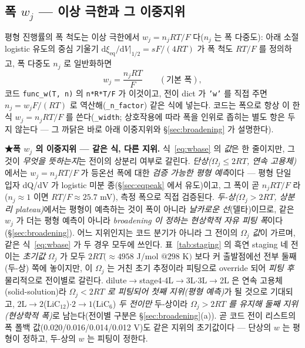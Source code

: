 \documentclass[11pt,a4paper]{article}
\newcommand{\dd}{\mathrm{d}}
\newcommand{\eq}{\mathrm{eq}}
\newcommand{\code}[1]{\texttt{#1}}
\begin{document}
\subsection{폭 $w_j$ — 이상 극한과 그 이중지위}
평형 진행률의 폭 척도는 이상 극한에서 $w_j=n_jRT/F$ 다($n_j$ 는 폭 다중도): 아래 소절 logistic 유도의
중심 기울기 $\dd\xi_\eq/\dd V|_{1/2}=sF/(4RT)$ 가 폭 척도 $RT/F$ 를 정의하고, 폭 다중도 $n_j$ 로 일반화하면
\begin{equation}
w_j=\frac{n_jRT}{F}\qquad(\text{기본 폭}),
\label{eq:wbase}
\end{equation}
코드 \code{func\_w(T, n)} 의 \code{n*R*T/F}
가 이것이고, 전이 dict 가 \code{'w'} 를 직접 주면 $n_j=w_jF/(RT)$ 로 역산해(\code{\_n\_factor}) 같은 식에 넣는다.
코드는 폭으로 항상 이 한 식 $w_j=n_jRT/F$ 를 쓴다(\code{\_width}; 상호작용에 따라 폭을 인위로 좁히는 별도 항은 두지
않는다 — 그 까닭은 바로 아래 이중지위와 \S\ref{sec:broadening} 가 설명한다).

\textbf{★폭 $w_j$ 의 이중지위 — 같은 식, 다른 지위.} 식~\eqref{eq:wbase} 의 \emph{값}은 한 줄이지만, 그것이
\emph{무엇을 뜻하는지}는 전이의 상분리 여부로 갈린다. \emph{단상($\Omega_j\le2RT$, 연속 고용체)}에서는 $w_j=n_jRT/F$
가 등온선 폭에 대한 \emph{검증 가능한 평형 예측}이다 — 평형 단일 입자 dQ/dV 가 logistic
미분 종(\S\ref{sec:eqpeak} 에서 유도)이고, 그 폭이 곧 $n_jRT/F$ 라($n_j\!\approx\!1$ 이면 $RT/F\!\approx\!25.7$ mV), 측정 폭으로 직접 검증된다.
\emph{두-상($\Omega_j>2RT$, 상분리 plateau)}에서는 평형이 예측하는 것이 폭이 아니라 \emph{날카로운 선}(델타)이므로,
같은 $w_j$ 가 더는 평형 예측이 아니라 \emph{broadening 이 정하는 현상학적 자유 피팅 폭}이다(\S\ref{sec:broadening}).
어느 지위인지는 코드 분기가 아니라 그 전이의 \emph{$\Omega_j$ 값}이 가르며, 같은 식~\eqref{eq:wbase} 가 두 경우 모두에
쓰인다. 표~\ref{tab:staging} 의 흑연 staging 네 전이는 \emph{초기값} $\Omega_j$ 가 모두 $2RT(\!\approx\!4958$ J/mol
$@298$ K$)$ 보다 커 출발점에선 전부 둘째(두-상) 쪽에 놓이지만, 이 $\Omega_j$ 는 거친 초기 추정이라 피팅으로
override 되어 \emph{피팅 후} 물리적으로 전이별로 갈린다. dilute$\to$stage4$\cdot$4L$\to$3L$\cdot$3L$\to$2L 은
연속 고용체(solid-solution)라 \emph{$\Omega_j<2RT$ 로 피팅되어 첫째 지위(평형 예측)}가 될 것으로 기대되고,
$2\mathrm L\!\to\!2$($\mathrm{LiC_{12}}$)$\cdot$$2\!\to\!1$($\mathrm{LiC_6}$) \emph{두 전이만} 두-상이라
\emph{$\Omega_j>2RT$ 를 유지해 둘째 지위(현상학적 폭)}로 남는다(전이별 구분은 \S\ref{sec:broadening}(a)).
곧 코드 전이 리스트의 폭 폴백 값(0.020/0.016/0.014/0.012 V)도 같은 지위의 초기값이다 — 단상의 $w$ 는 평형이
정하고, 두-상의 $w$ 는 피팅이 정한다.
\end{document}

